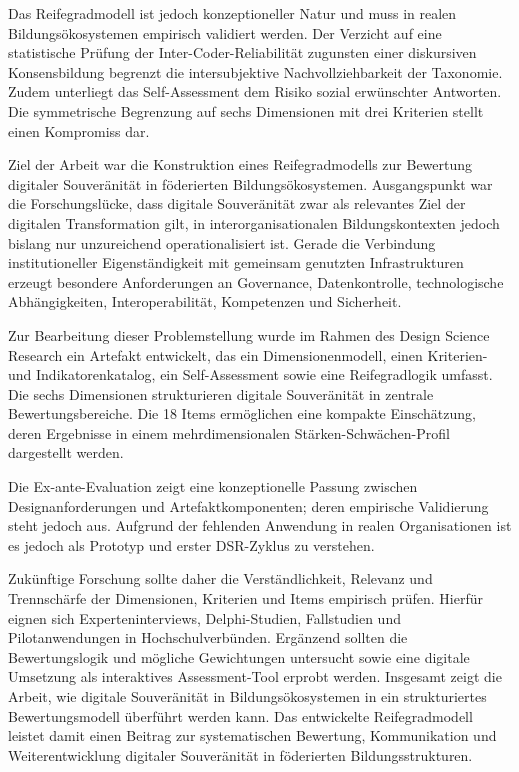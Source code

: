 \documentclass[10pt,a4paper]{article}
\begin{document}
Das Reifegradmodell ist jedoch konzeptioneller Natur und muss in realen Bildungsökosystemen empirisch validiert werden. Der Verzicht auf eine statistische Prüfung der Inter-Coder-Reliabilität zugunsten einer diskursiven Konsensbildung begrenzt die intersubjektive Nachvollziehbarkeit der Taxonomie. Zudem unterliegt das Self-Assessment dem Risiko sozial erwünschter Antworten. Die symmetrische Begrenzung auf sechs Dimensionen mit drei Kriterien stellt einen Kompromiss dar.

Ziel der Arbeit war die Konstruktion eines Reifegradmodells zur Bewertung digitaler Souveränität in föderierten Bildungsökosystemen. Ausgangspunkt war die Forschungslücke, dass digitale Souveränität zwar als relevantes Ziel der digitalen Transformation gilt, in interorganisationalen Bildungskontexten jedoch bislang nur unzureichend operationalisiert ist. Gerade die Verbindung institutioneller Eigenständigkeit mit gemeinsam genutzten Infrastrukturen erzeugt besondere Anforderungen an Governance, Datenkontrolle, technologische Abhängigkeiten, Interoperabilität, Kompetenzen und Sicherheit.

Zur Bearbeitung dieser Problemstellung wurde im Rahmen des Design Science Research ein Artefakt entwickelt, das ein Dimensionenmodell, einen Kriterien- und Indikatorenkatalog, ein Self-Assessment sowie eine Reifegradlogik umfasst. Die sechs Dimensionen strukturieren digitale Souveränität in zentrale Bewertungsbereiche. Die 18 Items ermöglichen eine kompakte Einschätzung, deren Ergebnisse in einem mehrdimensionalen Stärken-Schwächen-Profil dargestellt werden.

Die Ex-ante-Evaluation zeigt eine konzeptionelle Passung zwischen Designanforderungen und Artefaktkomponenten; deren empirische Validierung steht jedoch aus. Aufgrund der fehlenden Anwendung in realen Organisationen ist es jedoch als Prototyp und erster DSR-Zyklus zu verstehen.

Zukünftige Forschung sollte daher die Verständlichkeit, Relevanz und Trennschärfe der Dimensionen, Kriterien und Items empirisch prüfen. Hierfür eignen sich Experteninterviews, Delphi-Studien, Fallstudien und Pilotanwendungen in Hochschulverbünden. Ergänzend sollten die Bewertungslogik und mögliche Gewichtungen untersucht sowie eine digitale Umsetzung als interaktives Assessment-Tool erprobt werden. Insgesamt zeigt die Arbeit, wie digitale Souveränität in Bildungsökosystemen in ein strukturiertes Bewertungsmodell überführt werden kann. Das entwickelte Reifegradmodell leistet damit einen Beitrag zur systematischen Bewertung, Kommunikation und Weiterentwicklung digitaler Souveränität in föderierten Bildungsstrukturen.

\printbibliography
\end{document}
